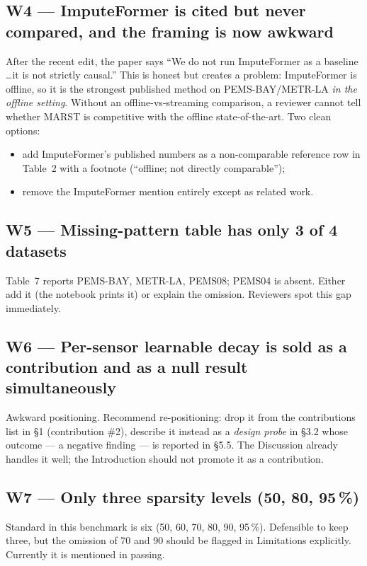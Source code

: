 \documentclass[11pt]{article}
\begin{document}
\subsection*{W4 --- ImputeFormer is cited but never compared, and the framing is now awkward}
After the recent edit, the paper says ``We do not run ImputeFormer as a
baseline \ldots it is not strictly causal.''  This is honest but
creates a problem: ImputeFormer is offline, so it is the strongest
published method on PEMS-BAY/METR-LA \emph{in the offline setting}.
Without an offline-vs-streaming comparison, a reviewer cannot tell
whether MARST is competitive with the offline state-of-the-art.  Two
clean options:
\begin{itemize}
\item add ImputeFormer's published numbers as a non-comparable
reference row in Table~2 with a footnote (``offline; not directly
comparable'');
\item remove the ImputeFormer mention entirely except as related
work.
\end{itemize}

\subsection*{W5 --- Missing-pattern table has only 3 of 4 datasets}
Table~7 reports PEMS-BAY, METR-LA, PEMS08; PEMS04 is absent.  Either
add it (the notebook prints it) or explain the omission.  Reviewers
spot this gap immediately.

\subsection*{W6 --- Per-sensor learnable decay is sold as a contribution and as a null result simultaneously}
Awkward positioning.  Recommend re-positioning: drop it from the
contributions list in \S1 (contribution \#2), describe it instead as a
\emph{design probe} in \S3.2 whose outcome --- a negative finding ---
is reported in \S5.5.  The Discussion already handles it well; the
Introduction should not promote it as a contribution.

\subsection*{W7 --- Only three sparsity levels (50, 80, 95\,\%)}
Standard in this benchmark is six (50, 60, 70, 80, 90, 95\,\%).
Defensible to keep three, but the omission of 70 and 90 should be
flagged in Limitations explicitly.  Currently it is mentioned in
passing.
\end{document}
